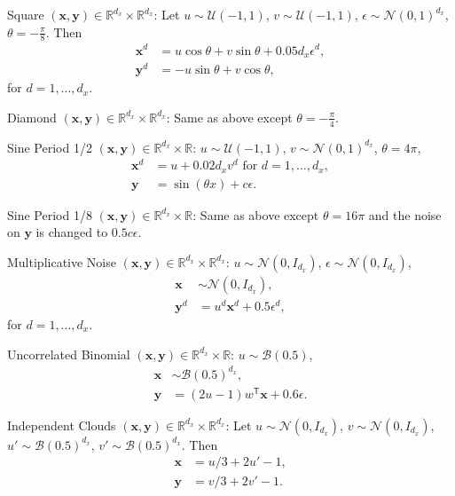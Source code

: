 \documentclass[11pt]{article}
\providecommand{\mb}[1]{\boldsymbol{#1}}
\providecommand{\mc}[1]{\mathcal{#1}}
\newcommand{\Real}{\mathbb{R}}
\newcommand{\T}{^{\ensuremath{\mathsf{T}}}}           %
\newcommand{\mbx}{\ensuremath{\mb{x}}}
\newcommand{\mby}{\ensuremath{\mb{y}}}
\begin{document}
\begin{compactenum}
\item Square $(\mbx,\mby) \in \Real^{d_{x}} \times \Real^{d_{x}}$: Let $u \sim \mc{U}(-1,1)$, $v \sim \mc{U}(-1,1)$, $\epsilon \sim \mc{N}(0,1)^{d_{x}}$, $\theta=-\frac{\pi}{8}$. Then
\begin{align*}
\mbx^{d}&=u \cos\theta + v \sin\theta + 0.05 d_{x}\epsilon^{d},\\
\mby^{d}&=-u \sin\theta + v \cos\theta,
\end{align*}
for $d=1,\ldots,d_{x}$.
\item Diamond $(\mbx,\mby) \in \Real^{d_{x}} \times \Real^{d_{x}}$: Same as above except $\theta=-\frac{\pi}{4}$.
\item Sine Period 1/2 $(\mbx,\mby) \in \Real^{d_{x}} \times \Real$: $u \sim \mc{U}(-1,1)$, $v \sim \mc{N}(0,1)^{d_{x}}$, $\theta=4\pi$,
\begin{align*}
\mbx^{d}&=u+0.02 d_{x} v^{d} \mbox{ for $d=1,\ldots,d_{x}$}, \\
\mby&=\sin ( \theta x )+c\epsilon.
\end{align*}
\item Sine Period 1/8 $(\mbx,\mby) \in \Real^{d_{x}} \times \Real$: Same as above except $\theta=16\pi$ and the noise on $\mby$ is changed to $0.5c\epsilon$.
\item Multiplicative Noise $(\mbx,\mby) \in \Real^{d_{x}} \times \Real^{d_{x}}$: $u \sim \mc{N}(0, I_{d_{x}})$, $\epsilon \sim \mc{N}(0, I_{d_{x}})$,
\begin{align*}
\mbx &\sim \mc{N}(0, I_{d_{x}}),\\
\mby^{d}&=u^{d}\mbx^{d}+0.5\epsilon^{d},
\end{align*}
for $d=1,\ldots,d_{x}$.
\item Uncorrelated Binomial $(\mbx,\mby) \in \Real^{d_{x}} \times \Real$: $u \sim \mc{B}(0.5)$,
\begin{align*}
\mbx &\sim \mc{B}(0.5)^{d_{x}},\\
\mby&=(2u-1)w\T \mbx+0.6\epsilon.
\end{align*}
\item Independent Clouds $(\mbx,\mby) \in \Real^{d_{x}} \times \Real^{d_{x}}$: Let $u \sim \mc{N}(0,I_{d_{x}})$, $v \sim \mc{N}(0,I_{d_{x}})$, $u' \sim \mc{B}(0.5)^{d_{x}}$, $v' \sim \mc{B}(0.5)^{d_{x}}$. Then
\begin{align*}
\mbx&=u/3+2u'-1,\\
\mby&=v/3+2v'-1.
\end{align*}
\end{compactenum}
\end{document}
